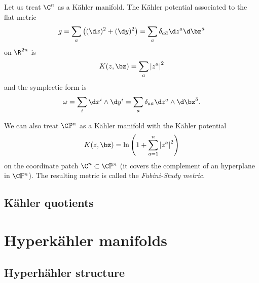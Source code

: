\documentclass{worksheetclass}
\begin{document}
        \begin{examp}
            Let us treat $\C^n$ as a Kähler manifold. The Kähler potential associated to the flat metric
            \begin{equation}
                g = \sum_a \left( (\d x)^2+(\d y)^2 \right) = \sum_a \delta_{a\bar{a}}\d z^a\d\bz^{\bar{a}}
            \end{equation}
            on $\R^{2n}$ is
            \begin{equation}
                K(z,\bz) = \sum_a\abs{z^a}^2
            \end{equation}
            and the symplectic form is
            \begin{equation}
                \omega = \sum_i \d x^i\wedge\d y^i = \sum_a \delta_{a\bar{a}}\d z^a\wedge\d\bz^{\bar{a}}.
            \end{equation}
        \end{examp}

        \begin{examp}
            We can also treat $\C\mathbb{P}^n$ as a Kähler manifold with the Kähler potential
            \begin{equation}
                K(z,\bz) = \ln\left( 1+\sum^n_{a=1}\abs{z^a}^2 \right)
            \end{equation}
            on the coordinate patch $\C^n\subset\C\mathbb{P}^n$ (it covers the complement of an hyperplane in $\C\mathbb{P}^n$). The resulting metric is called the \emph{Fubini-Study metric}.
        \end{examp}

    \subsection{Kähler quotients}

\section{Hyperkähler manifolds}

    \subsection{Hyperhähler structure}
\end{document}
